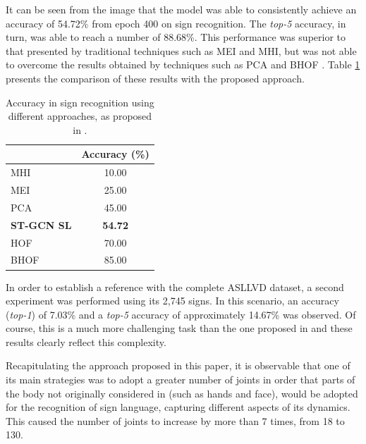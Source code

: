 It can be seen from the image that the model was able to consistently achieve an accuracy of 54.72\% from epoch 400 on sign recognition. The \textit{top-5} accuracy, in turn, was able to reach a number of 88.68\%. This performance was superior to that presented by traditional techniques such as MEI and MHI, but was not able to overcome the results obtained by techniques such as PCA and BHOF \cite{lim-2016}. Table \ref{tab:results-comparison-20} presents the comparison of these results with the proposed approach.

\begin{table}[ht]
\centering
\caption{Accuracy in sign recognition using different approaches, as proposed in \cite{lim-2016}.}
\label{tab:results-comparison-20}
\begin{tabular}{lc}
\hline
                   & Accuracy (\%)  \\ \hline
MHI                & 10.00                     \\
MEI                & 25.00                     \\
PCA                & 45.00                     \\
\textbf{ST-GCN SL} & \textbf{54.72}            \\
HOF                & 70.00                     \\
BHOF               & 85.00                     \\ \hline
\end{tabular}
\end{table}

In order to establish a reference with the complete ASLLVD dataset, a second experiment was performed using its 2,745 signs. In this scenario, an accuracy (\textit{top-1}) of 7.03\% and a \textit{top-5} accuracy of approximately 14.67\% was observed. Of course, this is a much more challenging task than the one proposed in \cite{lim-2016} and these results clearly reflect this complexity.

Recapitulating the approach proposed in this paper, it is observable that one of its main strategies was to adopt a greater number of joints in order that parts of the body not originally considered in \cite{st-gcn-2018} (such as hands and face), would be adopted for the recognition of sign language, capturing different aspects of its dynamics. This caused the number of joints to increase by more than 7 times, from 18 to 130.

